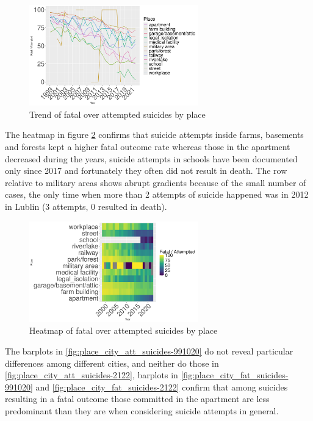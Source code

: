 \documentclass{article}
\begin{document}
\begin{figure}[H]
    \centering
    \includegraphics[width=0.65\textwidth]{imgs/place_foa.pdf}
    \caption{Trend of fatal over attempted suicides by place }
    \label{fig:place_foa}
\end{figure}
%
%
The heatmap in figure \ref{fig:place_foa_heat} confirms that 
suicide attempts inside farms, basements and forests kept a higher fatal outcome
rate whereas those in the apartment decreased during the years, suicide attempts in schools
have been documented only since 2017 and fortunately they often did not result in death.
The row relative to military areas shows abrupt gradients because of the small number of cases,
the only time when more than 2 attempts of suicide happened was in 2012 in Lublin (3 attempts, 0 resulted
in death).
%
%
\begin{figure}[H]
    \centering
    \includegraphics[width=0.65\textwidth]{imgs/place_foa_heat.pdf}
    \caption{Heatmap of fatal over attempted suicides by place }
    \label{fig:place_foa_heat}
\end{figure}
%
%
The barplots in \ref{fig:place_city_att_suicides-991020}
do not reveal particular differences among different cities,
and neither do those in \ref{fig:place_city_att_suicides-2122},
barplots in \ref{fig:place_city_fat_suicides-991020} and \ref{fig:place_city_fat_suicides-2122}
confirm that among suicides resulting in a fatal outcome those committed in the apartment
are less predominant than they are when considering suicide attempts in general.
\end{document}
